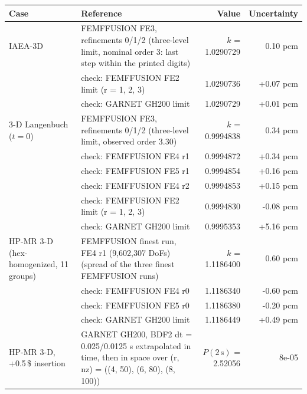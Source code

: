 \begin{tabular}{lp{7.3cm}rr}
\hline
Case & Reference & Value & Uncertainty \\
\hline
IAEA-3D & FEMFFUSION FE3, refinements 0/1/2 (three-level limit, nominal order 3: last step within the printed digits) & $k$ = 1.0290729 & 0.10 pcm \\
 & \quad check: FEMFFUSION FE2 limit (r = 1, 2, 3) & 1.0290736 & +0.07 pcm \\
 & \quad check: GARNET GH200 limit & 1.0290729 & +0.01 pcm \\
3-D Langenbuch ($t=0$) & FEMFFUSION FE3, refinements 0/1/2 (three-level limit, observed order 3.30) & $k$ = 0.9994838 & 0.34 pcm \\
 & \quad check: FEMFFUSION FE4 r1 & 0.9994872 & +0.34 pcm \\
 & \quad check: FEMFFUSION FE5 r1 & 0.9994854 & +0.16 pcm \\
 & \quad check: FEMFFUSION FE4 r2 & 0.9994853 & +0.15 pcm \\
 & \quad check: FEMFFUSION FE2 limit (r = 1, 2, 3) & 0.9994830 & -0.08 pcm \\
 & \quad check: GARNET GH200 limit & 0.9995353 & +5.16 pcm \\
HP-MR 3-D (hex-homogenized, 11 groups) & FEMFFUSION finest run, FE4 r1 (9,602,307 DoFs) (spread of the three finest FEMFFUSION runs) & $k$ = 1.1186400 & 0.60 pcm \\
 & \quad check: FEMFFUSION FE4 r0 & 1.1186340 & -0.60 pcm \\
 & \quad check: FEMFFUSION FE5 r0 & 1.1186380 & -0.20 pcm \\
 & \quad check: GARNET GH200 limit & 1.1186449 & +0.49 pcm \\
HP-MR 3-D, +0.5\,\$ insertion & GARNET GH200, BDF2 dt = 0.025/0.0125 s extrapolated in time, then in space over (r, nz) = ((4, 50), (6, 80), (8, 100)) & $P(2\,\mathrm{s})$ = 2.52056 & 8e-05 \\
\hline
\end{tabular}
